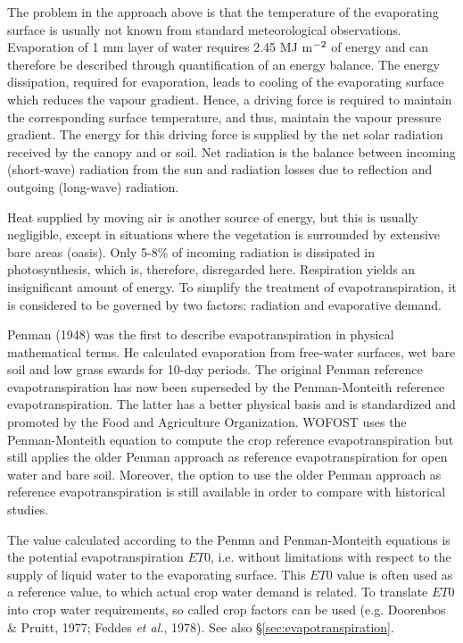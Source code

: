 The problem in the approach above is that the temperature of the evaporating surface is
usually not known from standard meteorological observations. Evaporation  of 1 mm
layer of water requires 2.45 MJ m$^{{\rm -2}}$ of energy and can therefore be described through
quantification of an energy balance. The energy dissipation, required for evaporation,
leads to cooling of the evaporating surface which reduces the vapour gradient. Hence, a
driving force is required to maintain the corresponding surface temperature, and thus,
maintain the vapour pres\-sure gradient. The energy for this driving force is supplied by the
net solar radiation received by the canopy and or soil.
Net radiation is the balance between incoming (short-wave) radiation from the sun and
radiation losses due to reflection and outgoing (long-wave) radiation. 

Heat supplied by
moving air is another source of energy, but this is usually negligible, except in situations
where the vegetation is surrounded by extensive bare areas (oasis). Only 5-8\% of
incoming radiation is dissipated in photosynthesis, which is, therefore, disregarded here.
Respiration yields an insignificant amount of energy. To simplify the treatment of
evapotranspiration, it is considered to be governed by two factors: radiation and evaporative demand.

Penman (1948) was the first to describe evapotranspiration in physical mathematical
terms. He calculated evaporation from free-water surfaces, wet bare soil and low grass
swards for 10-day periods. The original Penman reference evapotranspiration has now been 
superseded by the 
Penman-Monteith reference evapotranspiration. The latter has a better physical basis and
is standardized and promoted by the Food and Agriculture Organization. WOFOST uses the
Penman-Monteith equation to compute the crop reference evapotranspiration but still applies
the older Penman approach as reference evapotranspiration for open water and bare soil.
Moreover, the option to use the older Penman approach as reference evapotranspiration is still
available in order to compare with historical studies.

The value calculated according to the Penmn and Penman-Monteith equations is the potential 
evapotranspiration $ET0$, i.e. without limitations with respect to the supply of liquid water to the
evaporating surface. This $ET0$ value is often used as a reference value, to
which actual crop water demand is related. To translate $ET0$ into crop water require\-ments,
so called crop factors can be used (e.g. Doorenbos \& Pruitt, 1977; Feddes {\it et al.},
1978). See also \S \ref{sec:evapotranspiration}.

